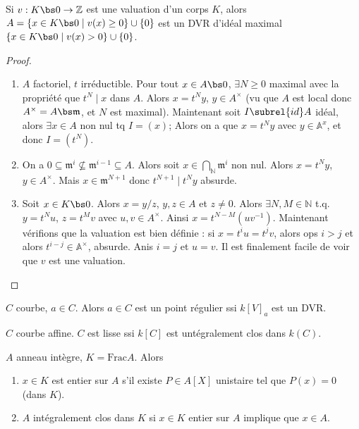         \begin{exo}
            Si $v : K \bs 0 \to \mathbb{Z}$ est une valuation d'un corps $K$, alors $A = \{x \in K \bs 0 \mid v(x) \geq 0\} \cup \{0\}$ est un DVR d'idéal maximal $\{x \in K \bs 0 \mid v(x) > 0\} \cup \{0\}$.
        \end{exo}
        \begin{proof}
            \begin{enumerate}
                \item $A$ factoriel, $t$ irréductible. Pour tout $x \in A \bs 0$, $\exists N \geq 0$ maximal avec la propriété que $t^N \mid x$ dans $A$. Alors $x = t^Ny$, $y \in A^\times$ (vu que $A$ est local donc $A^\times = A \bs \mathfrak{m}$, et $N$ est maximal). Maintenant soit $I \subrel{id} A$ idéal, alors $\exists x \in A$ non nul tq $I = (x)$; Alors on a que $x = t^Ny$ avec $y \in \mathbb{A}^x$, et donc $I = (t^N)$.
                \item On a $0 \subseteq \mathfrak{m}^i \nsubseteq \mathfrak{m}^{i-1} \subseteq A$. Alors soit $x \in \bigcap_{\mathbb{N}} \mathfrak{m}^i$ non nul. Alors $x = t^Ny$, $y \in A^\times$. Mais $x \in \mathfrak{m}^{N+1}$ donc $t^{N+1} \mid t^Ny$ absurde.
                \item Soit $x \in K \bs 0$. Alors $x = y/z$, $y,z \in A$ et $z \neq 0$. Alors $\exists N,M \in \mathbb{N}$ t.q. $y = t^Nu$, $z = t^Mv$ avec $u,v \in A^\times$. Ainsi $x = t^{N-M}(uv^{-1})$. Maintenant vérifions que la valuation est bien définie : si $x = t^iu = t^jv$, alors ops $i > j$ et alors $t^{i-j} \in \mathbb{A}^\times$, absurde. Anis $i = j$ et $u = v$. Il est finalement facile de voir que $v$ est une valuation.
            \end{enumerate}
        \end{proof}
        \begin{theo}
            $C$ courbe, $a \in C$. Alors $a \in C$ est un point régulier ssi $k[V]_a$ est un DVR.
        \end{theo}
        \begin{theo}
            $C$ courbe affine. $C$ est lisse ssi $k[C]$ est untégralement clos dans $k(C)$.
        \end{theo}
        \begin{defi}
            $A$ anneau intègre, $K = \mathrm{Frac} A$. Alors
            \begin{enumerate}
                \item $x \in K$ est entier sur $A$ s'il existe $P \in A[X]$ unistaire tel que $P(x) = 0$ (dans $K$).
                \item $A$ intégralement clos dans $K$ si $x \in K$ entier sur $A$ implique que $x \in A$.
            \end{enumerate}
        \end{defi}
